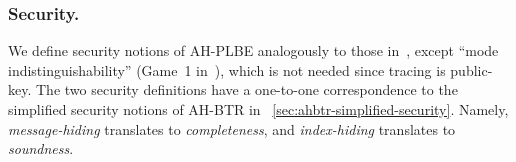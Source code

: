 \subsubsection{Security.}
We define security notions of AH-PLBE analogously to those in~\cite{EC:BonSahWat06}, except ``mode indistinguishability'' (Game~1 in~\cite{EC:BonSahWat06}), which is not needed since tracing is public-key.
The two security definitions have a one-to-one correspondence to the simplified security notions of AH-BTR in \Section~\ref{sec:ahbtr-simplified-security}.
Namely, \emph{message-hiding} translates to \emph{completeness}, and
\emph{index-hiding} translates to \emph{soundness}.
